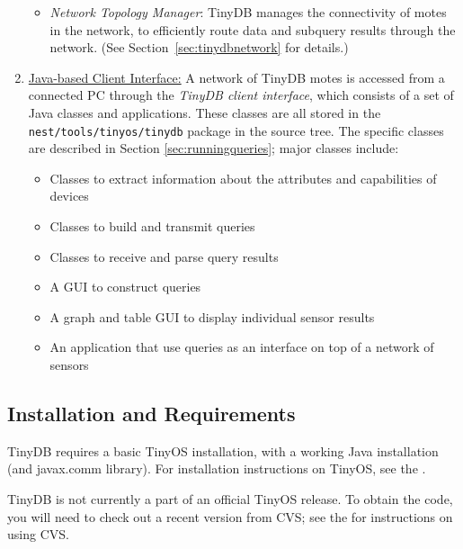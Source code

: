 \documentclass[11pt]{article}
\begin{document}
\begin{enumerate}
\begin{itemize}
\item {\it Network Topology Manager}: TinyDB manages the connectivity
  of motes in the network, to efficiently route data and subquery
  results through the network.  (See Section~\ref{sec:tinydbnetwork}
  for details.)
\end{itemize}
\item \underline{Java-based Client Interface:}
A network of TinyDB motes is accessed from a connected PC through the
{\em TinyDB client interface}, which consists
of a set of Java classes and applications.  These classes are all stored in the {\tt nest/tools/tinyos/tinydb} 
package in the source tree.  The specific classes are described in Section \ref{sec:runningqueries};  major
classes include:
\begin{itemize}
\item Classes to extract information about the attributes and capabilities of devices
\item Classes to build and transmit queries
\item Classes to receive and parse query results
\item A GUI to construct queries
\item A graph and table GUI to display individual sensor results
\item An application that use queries as an interface on top of a network of sensors
\end{itemize}
\end{enumerate}

\subsection{Installation and Requirements}
TinyDB requires a basic TinyOS installation, with a working Java
installation (and javax.comm library).  For installation instructions
on TinyOS, see the .

TinyDB is not currently a part of an official TinyOS release.  To obtain
the code, you will need to check out a recent version from CVS;  see the
for instructions on using CVS.
\end{document}
